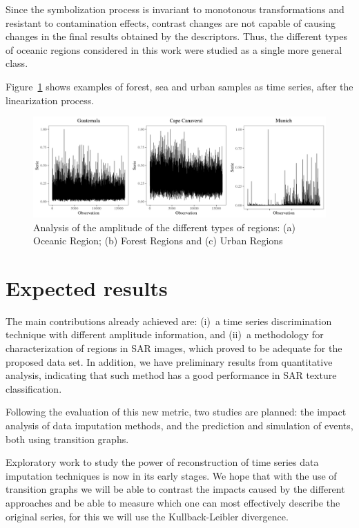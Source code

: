 \documentclass[paper=letter, fontsize=12pt]{article}
\begin{document}
Since the symbolization process is invariant to monotonous transformations and resistant to contamination effects, contrast chan\-ges are not capable of causing changes in the final results obtained by the descriptors.
Thus, the different types of oceanic regions considered in this work were studied as a single more general class.

Figure~\ref{fig:AmplitudeSAR} shows examples of forest, sea and urban samples as time series, after the linearization process.

\begin{figure}[hbt]
	\includegraphics[width=\columnwidth]{Figures/SAR_signal.pdf}
	\caption{Analysis of the amplitude of the different types of regions: (a) Oceanic Region; (b) Forest Regions and (c) Urban Regions}
	\label{fig:AmplitudeSAR}
\end{figure} 

\section{Expected results}\label{sec:results}

The main contributions already achieved are:
(i)~a time series discrimination technique with different amplitude information, and
(ii)~a methodology for characterization of regions in SAR images, which proved to be adequate for the proposed data set.
In addition, we have preliminary results from quantitative analysis, indicating that such method has a good performance in SAR texture classification.

Following the evaluation of this new metric, two studies are planned: 
the impact analysis of data imputation methods, and 
the prediction and simulation of events, both using transition graphs.

Exploratory work to study the power of reconstruction of time series data imputation techniques is now in its early stages.
We hope that with the use of transition graphs we will be able to contrast the impacts caused by the different approaches and be able to measure which one can most effectively describe the original series, for this we will use the Kullback-Leibler divergence.
\end{document}
